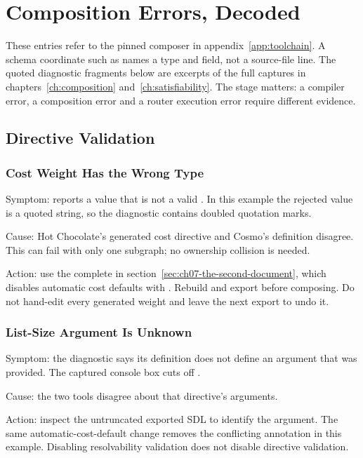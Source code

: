 \chapter{Composition Errors, Decoded}
\label{app:comperrors}

These entries refer to the pinned composer in appendix~\ref{app:toolchain}.
A schema coordinate such as  names a type and
field, not a source-file line. The quoted diagnostic fragments below are
excerpts of the full captures in chapters~\ref{ch:composition}
and~\ref{ch:satisfiability}. The stage matters: a compiler error, a composition
error and a router execution error require different evidence.

\section{Directive Validation}

\subsection*{Cost Weight Has the Wrong Type}

Symptom:  reports a value that is not a valid
. In this example the rejected value is a quoted string, so the
diagnostic contains doubled quotation marks.

Cause: Hot Chocolate's generated cost directive and Cosmo's definition
disagree. This can fail with only one subgraph; no ownership collision is
needed.

Action: use the complete  in
section~\ref{sec:ch07-the-second-document}, which disables automatic cost
defaults with . Rebuild and export before composing.
Do not hand-edit every generated weight and leave the next export to undo it.

\subsection*{List-Size Argument Is Unknown}

Symptom: the  diagnostic says its definition does not define
an argument that was provided. The captured console box cuts off
.

Cause: the two tools disagree about that directive's arguments.

Action: inspect the untruncated exported SDL to identify the argument.
The same automatic-cost-default change removes the conflicting annotation
in this example. Disabling resolvability validation does not disable
directive validation.

